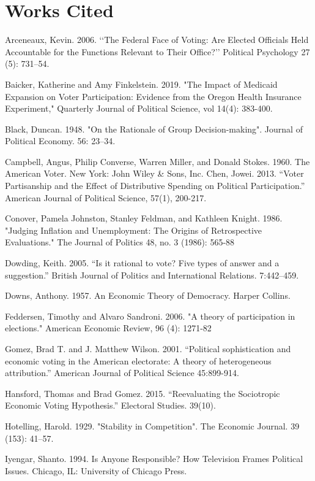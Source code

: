 \documentclass[12pt]{paper}
\begin{document}
\section*{Works Cited}
\singlespace 
\begin{hangparas}{.25in}{1}
	
Arceneaux, Kevin. 2006. ‘‘The Federal Face of Voting: Are Elected Officials Held Accountable for the Functions Relevant to Their Office?’’ Political Psychology 27 (5): 731–54.


Baicker, Katherine and Amy Finkelstein. 2019. "The Impact of Medicaid Expansion on Voter Participation: Evidence from the Oregon Health Insurance Experiment," Quarterly Journal of Political Science, vol 14(4): 383-400.


Black, Duncan. 1948. "On the Rationale of Group Decision-making". Journal of Political Economy. 56: 23–34.


Campbell, Angus, Philip Converse, Warren Miller, and Donald Stokes. 1960. The American Voter. New York: John Wiley \& Sons, Inc.
Chen, Jowei. 2013. “Voter Partisanship and the Effect of Distributive Spending on Political Participation.” American Journal of Political Science, 57(1), 200-217.


Conover, Pamela Johnston, Stanley Feldman, and Kathleen Knight. 1986. "Judging Inflation and Unemployment: The Origins of Retrospective Evaluations." The Journal of Politics 48, no. 3 (1986): 565-88


Dowding, Keith. 2005. “Is it rational to vote? Five types of answer and a suggestion.” British Journal of Politics and International Relations. 7:442–459.


Downs, Anthony. 1957. An Economic Theory of Democracy. Harper Collins.


Feddersen, Timothy and Alvaro Sandroni. 2006. "A theory of participation in elections." American Economic Review, 96 (4): 1271-82


Gomez, Brad T. and J. Matthew Wilson. 2001. “Political sophistication and economic voting in the American electorate: A theory of heterogeneous attribution.” American Journal of Political Science 45:899-914.


Hansford, Thomas and Brad Gomez. 2015. “Reevaluating the Sociotropic Economic Voting Hypothesis.” Electoral Studies. 39(10).


Hotelling, Harold. 1929. "Stability in Competition". The Economic Journal. 39 (153): 41–57.


Iyengar, Shanto. 1994. Is Anyone Responsible? How Television Frames Political Issues. Chicago, IL: University of Chicago Press.



\end{hangparas}
\end{document}
